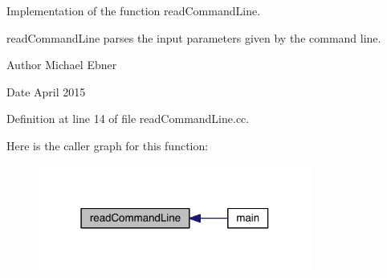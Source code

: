 Implementation of the function read\+Command\+Line. 

read\+Command\+Line parses the input parameters given by the command line.

\begin{DoxyAuthor}{Author}
Michael Ebner 
\end{DoxyAuthor}
\begin{DoxyDate}{Date}
April 2015 
\end{DoxyDate}


Definition at line 14 of file read\+Command\+Line.\+cc.



Here is the caller graph for this function\+:
\nopagebreak
\begin{figure}[H]
\begin{center}
\leavevmode
\includegraphics[width=255pt]{a00008_a20e7468e7c7621b99ed5a35e29a56623_icgraph}
\end{center}
\end{figure}


